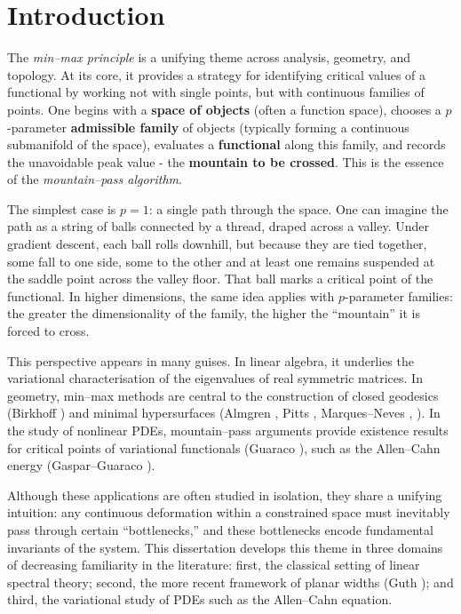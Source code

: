 \chapter{Introduction}
The \emph{min--max principle} is a unifying theme across analysis, geometry, and topology. At its core, it provides a strategy for identifying critical values of a functional by working not with single points, but with continuous families of points. One begins with a \textbf{space of objects} (often a function space), chooses a $p$-parameter \textbf{admissible family} of objects (typically forming a continuous submanifold of the space), evaluates a \textbf{functional} along this family, and records the unavoidable peak value - the \textbf{mountain to be crossed}. This is the essence of the \emph{mountain--pass algorithm}.  

The simplest case is $p=1$: a single path through the space. One can imagine the path as a string of balls connected by a thread, draped across a valley. Under gradient descent, each ball rolls downhill, but because they are tied together, some fall to one side, some to the other and at least one remains suspended at the saddle point across the valley floor. That ball marks a critical point of the functional. In higher dimensions, the same idea applies with $p$-parameter families: the greater the dimensionality of the family, the higher the ``mountain'' it is forced to cross. 

This perspective appears in many guises. In linear algebra, it underlies the variational characterisation of the eigenvalues of real symmetric matrices. In geometry, min--max methods are central to the construction of closed geodesics (Birkhoff \cite{Birkhoff27}) and minimal hypersurfaces (Almgren \cite{Almgren62}, Pitts \cite{Pitts81}, Marques--Neves \cite{MarquesNeves14}, \cite{MarquesNeves17}). In the study of nonlinear PDEs, mountain--pass arguments provide existence results for critical points of variational functionals (Guaraco \cite{Guaraco18}), such as the Allen--Cahn energy (Gaspar--Guaraco \cite{Guaraco16}).  

Although these applications are often studied in isolation, they share a unifying intuition: any continuous deformation within a constrained space must inevitably pass through certain “bottlenecks,” and these bottlenecks encode fundamental invariants of the system. This dissertation develops this theme in three domains of decreasing familiarity in the literature: first, the classical setting of linear spectral theory; second, the more recent framework of planar widths (Guth \cite{Guth07}); and third, the variational study of PDEs such as the Allen--Cahn equation.

